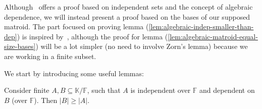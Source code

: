 Although~\cite{oxley1} offers a proof based on independent sets and the concept of algebraic dependence, we will instead present a proof based on the bases of our supposed matroid. The part focused on proving lemma (\ref{lem:algebraic-indep-smaller-than-dep}) is inspired by~\cite[214--216]{milne2022}, although the proof for lemma (\ref{lem:algebraic-matroid-equal-size-bases}) will be a lot simpler (no need to involve Zorn's lemma) because we are working in a finite subset.


We start by introducing some useful lemmas:
\begin{lemma}\label{lem:algebraic-indep-smaller-than-dep}
	Consider finite $A, B \subseteq \mathbb K / \mathbb F$, such that $A$ is independent over $\mathbb F$ and dependent on $B$ (over $\mathbb F$). Then $|B| \geq |A|$.
\end{lemma}

